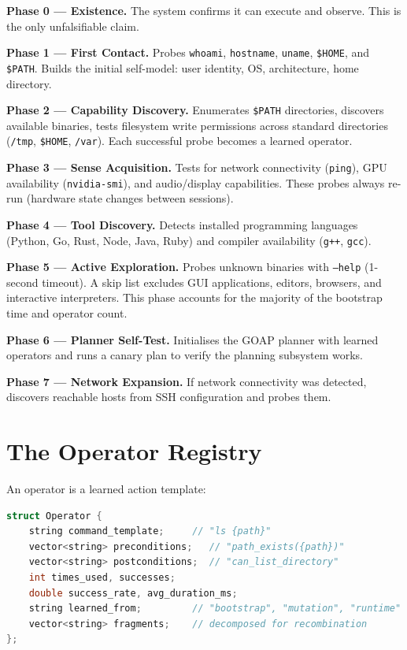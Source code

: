 \documentclass[12pt,a4paper]{report}
\begin{document}
\textbf{Phase 0 --- Existence.} The system confirms it can execute and observe. This is the only unfalsifiable claim.

\textbf{Phase 1 --- First Contact.} Probes \texttt{whoami}, \texttt{hostname}, \texttt{uname}, \texttt{\$HOME}, and \texttt{\$PATH}. Builds the initial self-model: user identity, OS, architecture, home directory.

\textbf{Phase 2 --- Capability Discovery.} Enumerates \texttt{\$PATH} directories, discovers available binaries, tests filesystem write permissions across standard directories (\texttt{/tmp}, \texttt{\$HOME}, \texttt{/var}). Each successful probe becomes a learned operator.

\textbf{Phase 3 --- Sense Acquisition.} Tests for network connectivity (\texttt{ping}), GPU availability (\texttt{nvidia-smi}), and audio/display capabilities. These probes always re-run (hardware state changes between sessions).

\textbf{Phase 4 --- Tool Discovery.} Detects installed programming languages (Python, Go, Rust, Node, Java, Ruby) and compiler availability (\texttt{g++}, \texttt{gcc}).

\textbf{Phase 5 --- Active Exploration.} Probes unknown binaries with \texttt{--help} (1-second timeout). A skip list excludes GUI applications, editors, browsers, and interactive interpreters. This phase accounts for the majority of the bootstrap time and operator count.

\textbf{Phase 6 --- Planner Self-Test.} Initialises the GOAP planner with learned operators and runs a canary plan to verify the planning subsystem works.

\textbf{Phase 7 --- Network Expansion.} If network connectivity was detected, discovers reachable hosts from SSH configuration and probes them.

\section{The Operator Registry}
An operator is a learned action template:
\begin{lstlisting}[language=C++]
struct Operator {
    string command_template;     // "ls {path}"
    vector<string> preconditions;   // "path_exists({path})"
    vector<string> postconditions;  // "can_list_directory"
    int times_used, successes;
    double success_rate, avg_duration_ms;
    string learned_from;         // "bootstrap", "mutation", "runtime"
    vector<string> fragments;    // decomposed for recombination
};
\end{lstlisting}
\end{document}
